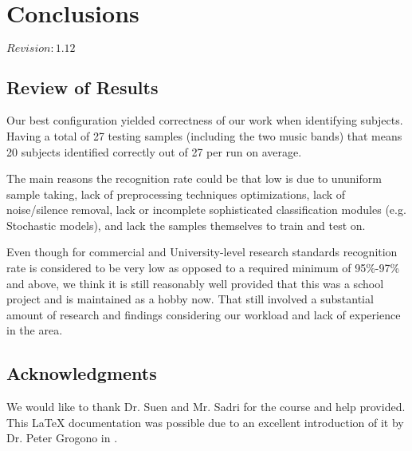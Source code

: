 \chapter{Conclusions}

$Revision: 1.12 $

\section{Review of Results}

Our best configuration yielded \bestscore{} correctness
of our work when identifying subjects. Having a total
of 27 testing samples (including the two music bands) that means
20 subjects identified correctly out of 27 per run on average.

The main reasons the recognition rate could be that low
is due to ununiform sample taking, lack of preprocessing
techniques optimizations, lack of noise/silence removal, lack or incomplete
sophisticated classification modules (e.g. Stochastic models),
and lack the samples themselves to train and test on.

Even though for commercial and University-level research
standards \bestscore{} recognition rate is considered to be very
low as opposed to a required minimum of 95\%-97\% and above,
we think it is still reasonably well provided that this was
a school project and is maintained as a hobby now.
That still involved a substantial
amount of research and findings considering our workload
and lack of experience in the area.

\section{Acknowledgments}

We would like to thank Dr. Suen and Mr. Sadri
for the course and help provided.
This {\LaTeX} documentation was possible due to an
excellent introduction of it by Dr. Peter Grogono
in \cite{grogono2001}.

